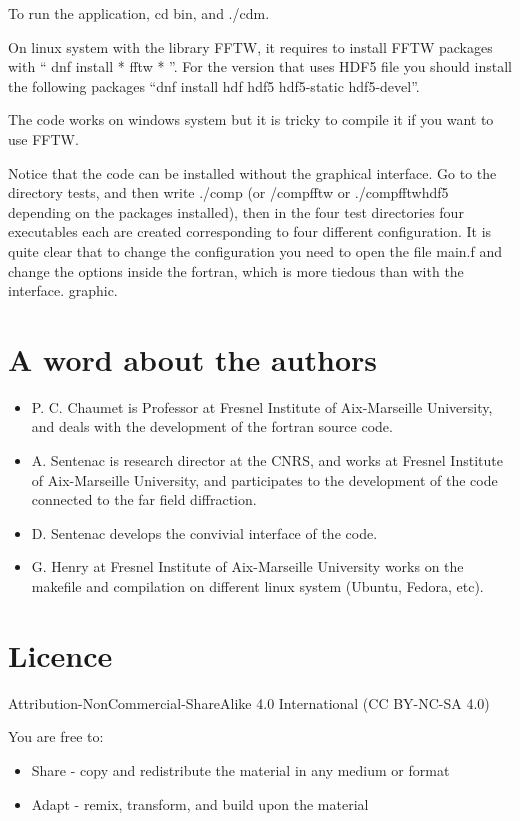 To run the application, cd bin, and ./cdm.


On linux system with the library FFTW, it requires to install FFTW
packages with `` dnf install * fftw * ''. For the version that uses
HDF5 file you should install the following packages ``dnf install hdf
hdf5 hdf5-static hdf5-devel''.

The code works on windows system but it is tricky to compile it if you
want to use FFTW.

Notice that the code can be installed without the graphical interface.
Go to the directory tests, and then write ./comp (or /compfftw or
./compfftwhdf5 depending on the packages installed), then in the four
test directories four executables each are created corresponding to
four different configuration. It is quite clear that to change the
configuration you need to open the file main.f and change the options
inside the fortran, which is more tiedous than with the interface.
graphic.

\section{A word about the authors}

\begin{itemize}
\item P. C. Chaumet is Professor at Fresnel Institute of Aix-Marseille
  University, and deals with the development of the fortran source
  code.
\item A. Sentenac is research director at the CNRS, and works at
  Fresnel Institute of Aix-Marseille University, and participates to
  the development of the code connected to the far field diffraction.
\item D. Sentenac develops the convivial interface of the code.
\item G. Henry at Fresnel Institute of Aix-Marseille University works
  on the makefile and compilation on different linux system (Ubuntu,
  Fedora, etc).
\end{itemize}

\section{Licence}


Attribution-NonCommercial-ShareAlike 4.0 International (CC BY-NC-SA 4.0)

You are free to:

\begin{itemize}
\item Share - copy and redistribute the material in any medium or
  format
\item Adapt - remix, transform, and build upon the material
\end{itemize}

